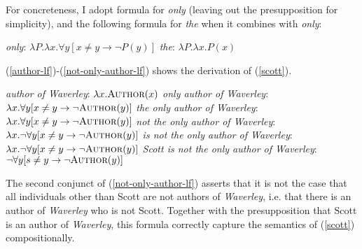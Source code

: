 For concreteness, I adopt  formula for \textit{only} (leaving out the presupposition for simplicity), and the following formula for \textit{the} when it combines with \textit{only}:

\begin{exe}
	\ex \textit{only}: $ \lambda P . \lambda x . \forall y [ x \ne y \to \neg P(y) ] $
	\ex \textit{the}: $\lambda P . \lambda x . P(x)$
\end{exe}

(\ref{author-lf})-(\ref{not-only-author-lf}) shows the derivation of (\ref{scott}).

\begin{exe}
	\ex \label{author-lf} \textit{author of Waverley}: $\lambda x . \textsc{Author}(x)$
	\ex \textit{only author of Waverley}: $\lambda x . \forall y [ x \ne y \to \neg \textsc{Author}(y) ]$
	\ex \textit{the only author of Waverley}: $\lambda x . \forall y [ x \ne y \to \neg \textsc{Author}(y) ]$
	\ex \textit{not the only author of Waverley}: $\lambda x . \neg  \forall y [ x \ne y \to \neg \textsc{Author}(y) ]$
	\ex \textit{is not the only author of Waverley}: $\lambda x . \neg  \forall y [ x \ne y \to \neg \textsc{Author}(y) ]$
	\ex \label{not-only-author-lf} \textit{Scott is not the only author of Waverley}: $\neg \forall y [ s \ne y \to \neg \textsc{Author}(y) ]$
\end{exe}

The second conjunct of (\ref{not-only-author-lf}) asserts that it is not the case that all individuals other than Scott are not authors of \textit{Waverley}, i.e. that there is an author of \textit{Waverley} who is not Scott. Together with the presupposition that Scott is an author of \textit{Waverley}, this formula correctly capture the semantics of (\ref{scott}) compositionally.